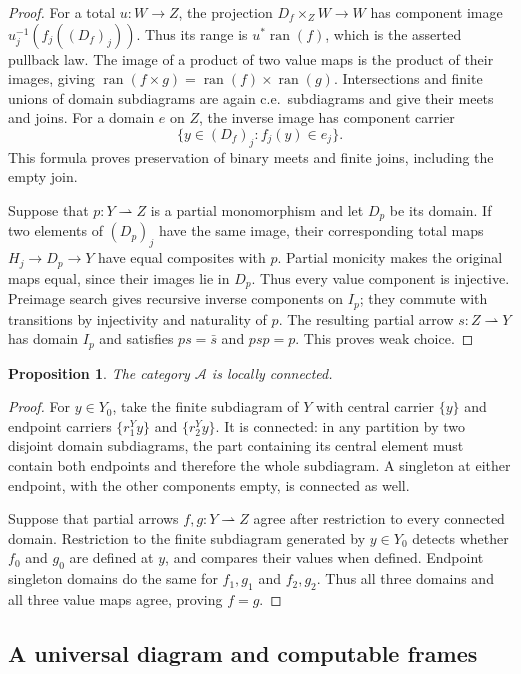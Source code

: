 \documentclass[11pt]{article}
\newtheorem{proposition}[theorem]{Proposition}
\newcommand{\ran}{\operatorname{ran}}
\begin{document}
\begin{proof}
For a total $u:W\to Z$, the projection
$D_f\times_Z W\to W$ has component image
$u_j^{-1}(f_j((D_f)_j))$. Thus its range is $u^*\ran(f)$,
which is the asserted pullback law. The image of a product
of two value maps is the product of their images, giving
$\ran(f\times g)=\ran(f)\times\ran(g)$.
Intersections and finite unions of domain subdiagrams are again
c.e.\ subdiagrams and give their meets and joins. For a domain
$e$ on $Z$, the inverse image has component carrier
\[
 \{y\in(D_f)_j:f_j(y)\in e_j\}.
\]
This formula proves preservation of binary meets and finite joins,
including the empty join.

Suppose that $p:Y\rightharpoonup Z$ is a partial monomorphism
and let $D_p$ be its domain. If two elements of $(D_p)_j$
have the same image, their corresponding total maps
$H_j\to D_p\to Y$ have equal composites with $p$.
Partial monicity makes the original maps equal, since their
images lie in $D_p$. Thus every value component is injective.
Preimage search gives recursive inverse components on $I_p$;
they commute with transitions by injectivity and naturality of $p$.
The resulting partial arrow $s:Z\rightharpoonup Y$ has domain
$I_p$ and satisfies $ps=\bar s$ and $psp=p$.
This proves weak choice.
\end{proof}

\begin{proposition}\label{prop:fork-local}
The category $\mathcal A$ is locally connected.
\end{proposition}
\begin{proof}
For $y\in Y_0$, take the finite subdiagram of $Y$ with central
carrier $\{y\}$ and endpoint carriers
$\{r_1^Yy\}$ and $\{r_2^Yy\}$. It is connected: in any partition
by two disjoint domain subdiagrams, the part containing its central
element must contain both endpoints and therefore the whole
subdiagram. A singleton at either endpoint, with the other
components empty, is connected as well.

Suppose that partial arrows $f,g:Y\rightharpoonup Z$ agree
after restriction to every connected domain. Restriction to the
finite subdiagram generated by $y\in Y_0$ detects whether
$f_0$ and $g_0$ are defined at $y$, and compares their values
when defined. Endpoint singleton domains do the same for
$f_1,g_1$ and $f_2,g_2$. Thus all three domains and all three
value maps agree, proving $f=g$.
\end{proof}

\subsection{A universal diagram and computable frames}
\end{document}
